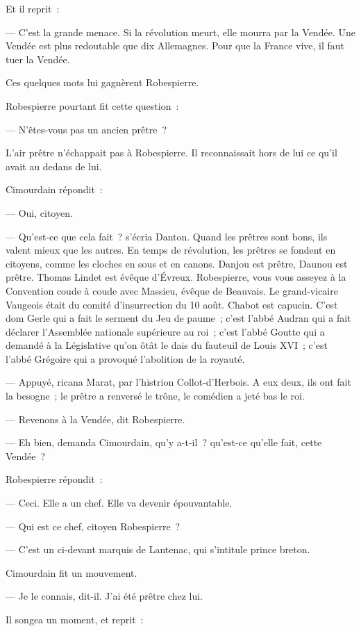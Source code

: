 \documentclass[french,twoside]{book} %
\begin{document}
Et il reprit :\par
 — C’est la grande menace. Si la révolution meurt, elle mourra par la Vendée. Une Vendée est plus redoutable que dix Allemagnes. Pour que la France vive, il faut tuer la Vendée.\par
Ces quelques mots lui gagnèrent Robespierre.\par
Robespierre pourtant fit cette question :\par
— N’êtes-vous pas un ancien prêtre ?\par
L’air prêtre n’échappait pas à Robespierre. Il reconnaissait hors de lui ce qu’il avait au dedans de lui.\par
Cimourdain répondit :\par
— Oui, citoyen.\par
— Qu’est-ce que cela fait ? s’écria Danton. Quand les prêtres sont bons, ils valent mieux que les autres. En temps de révolution, les prêtres se fondent en citoyens, comme les cloches en sous et en canons. Danjou est prêtre, Daunou est prêtre. Thomas Lindet est évêque d’Évreux. Robespierre, vous vous asseyez à la Convention coude à coude avec Massieu, évêque de Beauvais. Le grand-vicaire Vaugeois était du comité d’insurrection du 10 août. Chabot est capucin. C’est dom Gerle qui a fait le serment du Jeu de paume ; c’est l’abbé Audran qui a fait déclarer l’Assemblée nationale supérieure au roi ; c’est l’abbé Goutte qui a demandé à la Législative qu’on ôtât le dais du fauteuil de Louis XVI ; c’est l’abbé Grégoire qui a provoqué l’abolition de la royauté.\par
— Appuyé, ricana Marat, par l’histrion Collot-d’Herbois. A eux deux, ils ont fait la besogne ; le prêtre a renversé le trône, le comédien a jeté bas le roi.\par
 — Revenons à la Vendée, dit Robespierre.\par
— Eh bien, demanda Cimourdain, qu’y a-t-il ? qu’est-ce qu’elle fait, cette Vendée ?\par
Robespierre répondit :\par
— Ceci. Elle a un chef. Elle va devenir épouvantable.\par
— Qui est ce chef, citoyen Robespierre ?\par
— C’est un ci-devant marquis de Lantenac, qui s’intitule prince breton.\par
Cimourdain fit un mouvement.\par
— Je le connais, dit-il. J’ai été prêtre chez lui.\par
Il songea un moment, et reprit :\par
\end{document}

